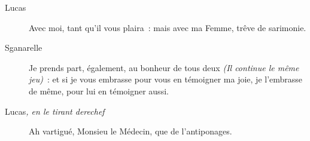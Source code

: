 \documentclass[french,twoside]{book} %
\begin{document}
 \begin{description} \item[Lucas] 

Avec moi, tant qu’il vous plaira : mais avec ma Femme, trêve de sarimonie.\end{description}
 \begin{description} \item[Sganarelle] 

Je prends part, également, au bonheur de tous deux \textit{(Il continue le même jeu)} : et si je vous embrasse pour vous en témoigner ma joie, je l’embrasse de même, pour lui en témoigner aussi.\end{description}
 \begin{description} \item[Lucas\textit{, en le tirant derechef}\par
] 

Ah vartigué, Monsieu le Médecin, que de l’antiponages.\end{description}
\end{document}
